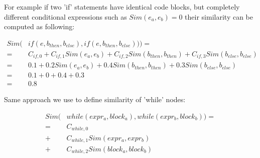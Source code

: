 \begin{exmp} For example if two 'if' statements have identical code blocks, but completely different conditional expressions such as $Sim(e_a,e_b) = 0$ their
similarity can be computed as following:

\begin{align*}
	Sim(&if(e, b_{then}, b_{else}), if(e, b_{then}, b_{else}))) = \\
	=& C_{if,0} + C_{if,1} Sim(e_a, e_b) + C_{if,2} Sim(b_{then}, b_{then}) + C_{if,3} Sim(b_{else}, b_{else}) \\
	=& 0.1 + 0.2 Sim(e_a, e_b) +	0.4 Sim(b_{then}, b_{then}) +	0.3 Sim(b_{else}, b_{else}) \\
	=& 0.1 + 0 + 0.4 + 0.3 \\
	=& 0.8
\end{align*}

\end{exmp}

\begin{mydef} Same approach we use to define similarity of 'while' nodes:

\begin{align*}
	Sim(&while(expr_a, block_a), while(expr_b, block_b)) = \\
	=&C_{while,0} \\
	+&C_{while,1} Sim(expr_a, expr_b) \\
	+&C_{while,2} Sim(block_a, block_b)
\end{align*}

\end{mydef}




